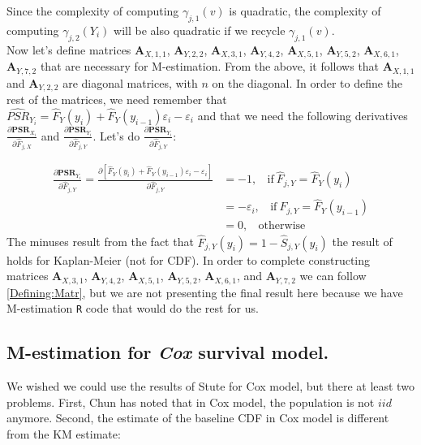 \documentclass[]{article}
\let\epsilon\varepsilon
\begin{document}
Since the complexity of computing $\gamma_{j,1}(v)$ is quadratic, the complexity of computing $\gamma_{j,2}(Y_i)$ will be also quadratic if we recycle $\gamma_{j,1}(v)$.\\

Now let's define matrices $\pmb{A}_{X,1,1}$, $\pmb{A}_{Y,2,2}$, $\pmb{A}_{X,3,1}$, $\pmb{A}_{Y, 4,2}$,  $\pmb{A}_{X,5,1}$, $\pmb{A}_{Y,5,2}$, $\pmb{A}_{X,6,1}$, $\pmb{A}_{Y, 7,2}$ that are necessary for M-estimation.  From the above, it follows that $\pmb{A}_{X,1,1}$ and $\pmb{A}_{Y,2,2}$ are diagonal matrices, with $n$ on the diagonal. In order to define the rest of the matrices, we need remember that $\widehat{PSR}_{Y_i} = \hat{F}_Y(y_i) + \hat{F}_Y(y_{i-1})\epsilon_i - \epsilon_i$ and that we need the following derivatives $\frac{\partial \pmb{PSR}_{X_i}}{\partial \hat{F}_{j,X}}$ and $\frac{\partial \pmb{PSR}_{Y_i}}{\partial \hat{F}_{j,Y}}$. Let's do $\frac{\partial \pmb{PSR}_{Y_i}}{\partial \hat{F}_{j,Y}}$:

$$
  \begin{aligned}
    \frac{\partial \pmb{PSR}_{Y_i}}{\partial \hat{F}_{j,Y}} = \frac{\partial \left[  \hat{F}_Y(y_i) + \hat{F}_Y(y_{i-1})\epsilon_i - \epsilon_i  \right]}{\partial \hat{F}_{j,Y}} &= -1,~~~~\text{if}~\hat{F}_{j,Y} = \hat{F}_Y(y_i)\\
    &=-\epsilon_i,~~~~\text{if}~\hat{F}_{j,Y} = \hat{F}_Y(y_{i-1})\\ 
    &=0,~~~~\text{otherwise}
  \end{aligned}
$$
The minuses result from the fact that $\hat{F}_{j,Y}(y_i) = 1- \hat{S}_{j,Y}(y_i)$ the result of \cite{stute1995central} holds for Kaplan-Meier (not for CDF).
In order to complete constructing matrices $\pmb{A}_{X,3,1}$, $\pmb{A}_{Y, 4,2}$,  $\pmb{A}_{X,5,1}$, $\pmb{A}_{Y,5,2}$, $\pmb{A}_{X,6,1}$, and $\pmb{A}_{Y, 7,2}$  we can follow \ref{Defining:Matr}, but we are not presenting the final result here because we have M-estimation \texttt{R} code that would do the rest for us.

\subsection{M-estimation for \emph{Cox} survival model.}

We wished we could use the results of Stute for Cox model, but there at least two problems. First, Chun has noted that in Cox model, the population is not $iid$ anymore. Second, the estimate of the baseline CDF in Cox model is different from the KM estimate:
\end{document}
